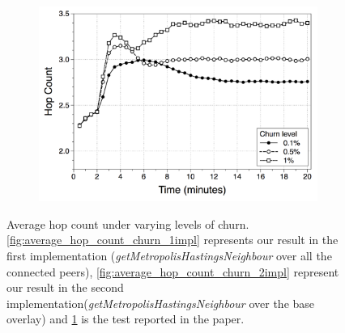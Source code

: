 \begin{figure}
\begin{subfigure}{.5\textwidth}
  \includegraphics[keepaspectratio=true, width=1\linewidth]{images/paper_average_hop_count_churn}
  \caption{}
  \label{fig:paper_average_hop_count_churn}
\end{subfigure}
\caption{Average hop count under varying levels of churn.  \ref{fig:average_hop_count_churn_1impl} represents our result in the first implementation (\textit{getMetropolisHastingsNeighbour} over all the connected peers), \ref{fig:average_hop_count_churn_2impl} represent our result in the second implementation(\textit{getMetropolisHastingsNeighbour} over the base overlay) and \ref{fig:paper_average_hop_count_churn} is the test reported in the paper.}
\label{fig:robustness_hop_count_churn}
\end{figure}

